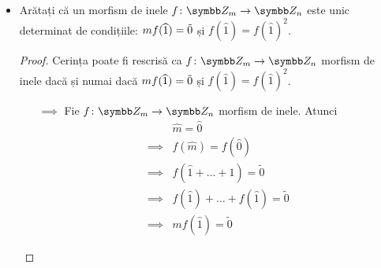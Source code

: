 \begin{exercise}[3.11]
\begin{itemize}
\begin{proof}
\begin{itemize}
        Trebuie să arătăm mai întâi că această funcție este bine definită. Indiferent de ce reprezentanți am alege pentru aceeași clasă de resturi, trebuie să ne asigurăm că funcția ia aceeași valoare. Altfel spus, \(\forall \widehat{x}, \widehat{y} \in \integersmod{m}\) cu \(\widehat{x} = \widehat{y}\) și \(x \neq y\), vrem ca \(f(\widehat{x}) = f(\widehat{y})\).
        \begin{align*}
            &\begin{rcases*}
            \widehat{x} = \widehat{y} \iff m \mid (x - y) \\
            n \mid m
            \end{rcases*}
            \implies n \mid (x - y) \\
            &\iff \widetilde{x} = \widetilde{y} \\
            &\iff f(\widehat{x}) = f(\widehat{y})
        \end{align*}
        
        Acum trebuie să demonstrăm că \(f\) este morfism unitar de inele. Acest lucru se poate face destul de simplu, deoarece ``căciula'' comută cu operațiile uzuale. Deci \(f(\widehat{a} + \widehat{b}) = f(\widehat{a + b}) = \widetilde{a + b} = \widetilde{a} + \widetilde{b}\), și analog pentru înmulțire.
    \end{itemize} 
    \end{proof}

    \item Arătați că un morfism de inele \(\function{f}{\integersmod{m}}{\integersmod{n}}\) este unic determinat de condițiile: \(m f(\widehat{1}) = \Tilde{0}\) și \(f(\widehat{1}) = f(\widehat{1})^2\).
    \begin{proof}
    Cerința poate fi rescrisă ca \(\function{f}{\integersmod{m}}{\integersmod{n}}\) morfism de inele dacă și numai dacă \(m f(\widehat{1}) = \Tilde{0}\) și \(f(\widehat{1}) = f(\widehat{1})^2\).
    
    \begin{itemize}
        \item[\(\implies\)] Fie \(\function{f}{\integersmod{m}}{\integersmod{n}}\) morfism de inele. Atunci
        \begin{align*}
            &\widehat{m} = \widehat{0} \\
            \implies &f(\widehat{m}) = f(\widehat{0}) \\
            \implies &f(\widehat{1} + \dots + \widehat{1}) = \widetilde{0} \\
            \implies &f(\widehat{1}) + \dots + f(\widehat{1}) = \widetilde{0} \\
            \implies &m f(\widehat{1}) = \widetilde{0}
        \end{align*}
        

\end{itemize}
\end{proof}
\end{itemize}
\end{exercise}
